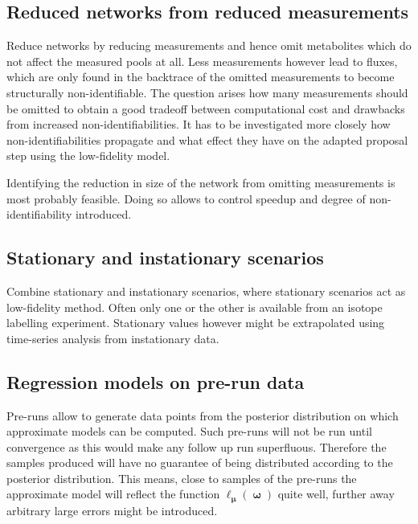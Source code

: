 \documentclass[10pt]{article}
\DeclareMathOperator\likeli{\ell}
\DeclareMathOperator\bmu{\boldsymbol{\mu}}
\DeclareMathOperator\bomega{\boldsymbol{\omega}}
\begin{document}
\subsection{Reduced networks from reduced measurements}
Reduce networks by reducing measurements and hence omit metabolites which do not affect the measured pools at all.
Less measurements however lead to fluxes, which are only found in the backtrace of the omitted 
measurements to become structurally non-identifiable.
The question arises how many measurements should be omitted to obtain a good tradeoff between 
computational cost and drawbacks from increased non-identifiabilities.
It has to be investigated more closely how non-identifiabilities propagate and what effect they
have on the adapted proposal step using the low-fidelity model.

Identifying the reduction in size of the network from omitting measurements is most probably 
feasible.
Doing so allows to control speedup and degree of non-identifiability introduced.

\subsection{Stationary and instationary scenarios}
Combine stationary and instationary scenarios, where stationary scenarios act as low-fidelity method. 
Often only one or the other is available from an isotope labelling experiment. 
Stationary values however might be extrapolated using time-series analysis from instationary data. 
    
\subsection{Regression models on pre-run data}
Pre-runs allow to generate data points from the posterior distribution on which approximate models can
be computed.
Such pre-runs will not be run until convergence as this would make any follow up run superfluous.
Therefore the samples produced will have no guarantee of being distributed according to the posterior distribution.
This means, close to samples of the pre-runs the approximate model will reflect the function $\likeli_{\bmu}(\bomega)$
quite well, further away arbitrary large errors might be introduced.
\end{document}
